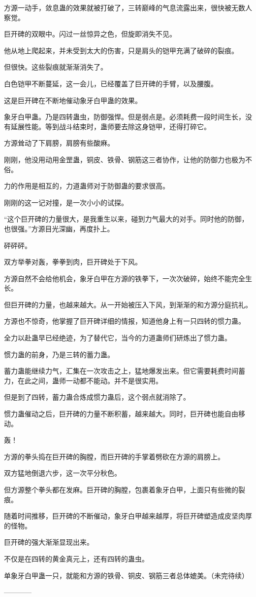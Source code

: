 \begin{this_body}
方源一动手，敛息蛊的效果就被打破了，三转巅峰的气息流露出来，很快被无数人察觉。

巨开碑的双眼中。闪过一丝惊异之色，但旋即消失不见。

他从地上爬起来，并未受到太大的伤害，只是肩头的铠甲充满了破碎的裂痕。

但很快。这些裂痕就渐渐消失了。

白色铠甲不断蔓延，这一会儿，已经覆盖了巨开碑的手臂，以及腰腹。

这是巨开碑在不断地催动象牙白甲蛊的效果。

象牙白甲蛊。乃是四转蛊虫，防御强悍。但是弱点是。必须耗费一段时间生长，没有延展性能。等到战斗结束时，蛊师要去除这身铠甲，还得打碎它。

方源耸动了下肩膀，肩膀有些酸麻。

刚刚，他没用动用金罡蛊，铜皮、铁骨、钢筋这三者协作，让他的防御力也极为不俗。

力的作用是相互的，力道蛊师对于防御蛊的要求很高。

刚刚的这一记对撞，是一次小小的试探。

“这个巨开碑的力量很大，是我重生以来，碰到力气最大的对手。同时他的防御，也很强。”方源目光深幽，再度扑上。

砰砰砰。

双方举拳对轰，拳拳到肉，巨开碑处于下风。

方源自然不会给他机会，象牙白甲在方源的铁拳下，一次次破碎，始终不能完全生长。

但巨开碑的力量，也越来越大。从一开始被压入下风，到渐渐的和方源分庭抗礼。

方源也不惊奇，他掌握了巨开碑详细的情报，知道他身上有一只四转的惯力蛊。

全力以赴蛊早已经绝迹，为了替代它，当今的力道蛊师们研炼出了惯力蛊。

惯力蛊的前身，乃是三转的蓄力蛊。

蓄力蛊能继续力气，汇集在一次攻击之上，猛地爆发出来。但它需要耗费时间蓄力，在此之间，蛊师一动都不能动。并不是很实用。

但是到了四转，蓄力蛊合炼成惯力蛊后，这个弱点就消除了。

惯力蛊催动之后，巨开碑的力量不断积蓄，越来越大。同时，巨开碑也能自由移动。

轰！

方源的拳头捣在巨开碑的胸膛，而巨开碑的手掌着劈砍在方源的肩膀上。

双方猛地倒退六步，这一次平分秋色。

但方源整个拳头都在发麻。巨开碑的胸膛，包裹着象牙白甲，上面只有些微的裂痕。

随着时间推移，巨开碑的不断催动，象牙白甲越来越厚，将巨开碑塑造成皮坚肉厚的怪物。

巨开碑的强大渐渐显现出来。

不仅是在四转的黄金真元上，还有四转的蛊虫。

单象牙白甲蛊一只，就能和方源的铁骨、铜皮、钢筋三者总体媲美。（未完待续）

------------

\end{this_body}

